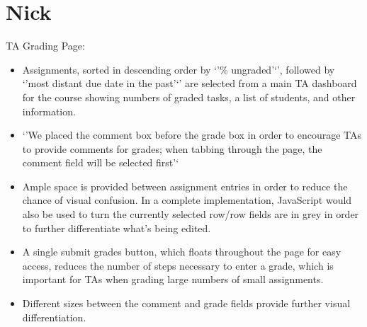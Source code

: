 \section{Nick}

TA Grading Page:

\begin{itemize}
\item Assignments, sorted in descending order by `'\% ungraded'`', followed by `'most distant due date in the past'`' are selected from a main TA dashboard for the course showing numbers of graded tasks, a list of students, and other information.

\item `'We placed the comment box before the grade box in order to encourage TAs to provide comments for grades; when tabbing through the page, the comment field will be selected first'`

\item Ample space is provided between assignment entries in order to reduce the chance of visual confusion. In a complete implementation, JavaScript would also be used to turn the currently selected row/row fields are in grey in order to further differentiate what's being edited.

\item A single submit grades button, which floats throughout the page for easy access, reduces the number of steps necessary to enter a grade, which is important for TAs when grading large numbers of small assignments.

\item Different sizes between the comment and grade fields provide further visual differentiation.
\end{itemize}